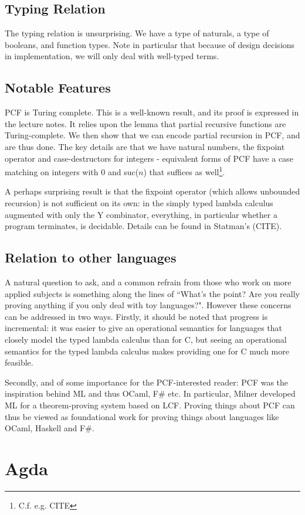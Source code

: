 \documentclass[12pt,a4paper,twoside,openright]{report}
\begin{document}
\subsection{Typing Relation}
The typing relation is unsurprising. We have a type of naturals, a type of booleans, and function types. Note in particular that because of design decisions in implementation, we will only deal with well-typed terms.
\subsection{Notable Features}
PCF is Turing complete. This is a well-known result, and its proof is expressed in the lecture notes. It relies upon the lemma that partial recursive functions are Turing-complete. We then show that we can encode partial recursion in PCF, and are thus done. The key details are that we have natural numbers, the fixpoint operator and case-destructors for integers - equivalent forms of PCF have a case matching on integers with $0$ and suc($n$) that suffices as well\footnote{C.f. e.g. CITE}. 

A perhaps surprising result is that the fixpoint operator (which allows unbounded recursion) is not sufficient on its own: in the simply typed lambda calculus augmented with only the Y combinator, everything, in particular whether a program terminates, is decidable. Details can be found in Statman's (CITE). 
\subsection{Relation to other languages}
A natural question to ask, and a common refrain from those who work on more applied subjects is something along the lines of ``What's the point? Are you really proving anything if you only deal with toy languages?". However these concerns can be addressed in two ways. Firstly, it should be noted that progress is incremental: it was easier to give an operational semantics for languages that closely model the typed lambda calculus than for C, but seeing an operational semantics for the typed lambda calculus makes providing one for C much more feasible. 

Secondly, and of some importance for the PCF-interested reader: PCF was the inspiration behind ML and thus OCaml, F\# etc. In particular, Milner developed ML for a theorem-proving system based on LCF. Proving things about PCF can thus be viewed as foundational work for proving things about languages like OCaml, Haskell and F\#.
\section{Agda}
\end{document}
